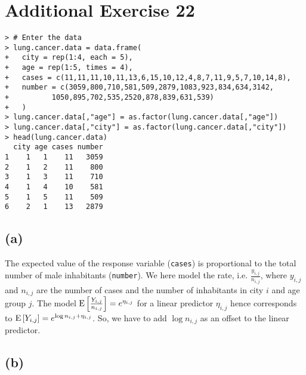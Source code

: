 \section*{Additional Exercise 22}

\begin{lstlisting}
> # Enter the data
> lung.cancer.data = data.frame(
+   city = rep(1:4, each = 5),
+   age = rep(1:5, times = 4),
+   cases = c(11,11,11,10,11,13,6,15,10,12,4,8,7,11,9,5,7,10,14,8),
+   number = c(3059,800,710,581,509,2879,1083,923,834,634,3142,
+          1050,895,702,535,2520,878,839,631,539)
+   )
> lung.cancer.data[,"age"] = as.factor(lung.cancer.data[,"age"])
> lung.cancer.data[,"city"] = as.factor(lung.cancer.data[,"city"])
> head(lung.cancer.data)
  city age cases number
1    1   1    11   3059
2    1   2    11    800
3    1   3    11    710
4    1   4    10    581
5    1   5    11    509
6    2   1    13   2879
\end{lstlisting}


\subsection*{(a)}
The expected value of the response variable (\texttt{cases}) is proportional to the total number of male inhabitants (\texttt{number}). We here model the rate, i.e. $\frac{y_{i,j}}{n_{i,j}}$, where $y_{i,j}$ and $n_{i,j}$ are the number of cases and the number of inhabitants in city $i$ and age group $j$. The model $\mathrm{E}\left[\frac{Y_{i,j}}{n_{i,j}}\right] = e^{\eta_{i,j}}$ for a linear predictor $\eta_{i,j}$ hence corresponds to $\mathrm{E}\left[Y_{i,j}\right] = e^{\log n_{i,j} + \eta_{i,j}}$. So, we have to add $\log n_{i,j}$ as an offset to the linear predictor.


\vspace{\baselineskip}
\subsection*{(b)}

